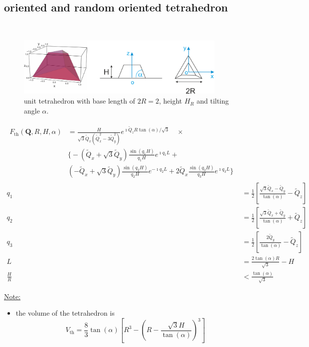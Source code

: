 \subsection{oriented and random oriented tetrahedron} ~\\
\cite{Renaud2009}
\begin{figure}[htb]
\begin{center}
\includegraphics[width=0.9\textwidth]{../images/form_factor/oriented_primitive_opbjects/tetrahedron.png}
\end{center}
\caption{unit tetrahedron with base length of $2R=2$, height $H_R$ and tilting angle $\alpha$.}
\label{fig:opo_tetrahedron}
\end{figure}


\begin{align}\label{eq:opo_tetrah}
\begin{split}
 F_\mathrm{th}(\mathbf{Q},R,H,\alpha) & = \frac{H}{\sqrt{3}\tilde{Q}_x\left(\tilde{Q}_x^2-3\tilde{Q}_y^2\right)} e^{\imath\tilde{Q}_zR\tan(\alpha)/\sqrt{3}} \quad \times\\
     &  \Bigg\{-\left(\tilde{Q}_x+\sqrt{3}\tilde{Q}_y\right) \frac{\sin(q_1H)}{q_1H}e^{\imath q_1L}  +\\
     & \left(-\tilde{Q}_x+\sqrt{3}\tilde{Q}_y\right)\frac{\sin(q_2H)}{q_2H}e^{-\imath q_2L} +2\tilde{Q}_x \frac{\sin(q_3H)}{q_3H}e^{\imath q_3L}\Bigg\}
\end{split} \\
  q_1 & =\frac12 \left[\frac{\sqrt{3}\tilde{Q}_x-\tilde{Q}_y}{\tan(\alpha)}-\tilde{Q}_z\right]\\
  q_2 & =\frac12 \left[\frac{\sqrt{3}\tilde{Q}_x+\tilde{Q}_y}{\tan(\alpha)}+\tilde{Q}_z\right]\\
  q_3 & =\frac12 \left[\frac{2\tilde{Q}_y}{\tan(\alpha)}-\tilde{Q}_z\right]\\
  L & =\frac{2\tan(\alpha)R}{\sqrt{3}}-H\\
  \frac{H}{R} & < \frac{\tan(\alpha)}{\sqrt{3}}
\end{align}

\noindent\uline{Note:}
\begin{itemize}
\item the volume of the tetrahedron is
$$V_\mathrm{th}=\frac{8}{3} \tan(\alpha) \left[R^3 - \left(R-\frac{\sqrt{3}H}{\tan(\alpha)}\right)^3 \right]  $$
\end{itemize}

